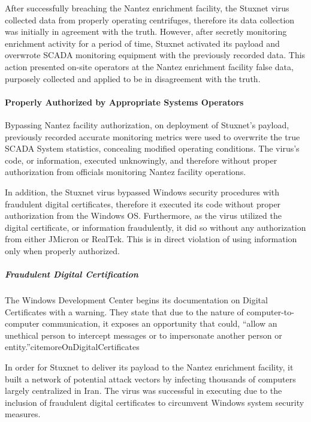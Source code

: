\documentclass[12pt]{article}
\begin{document}
\begin{multicols}{2}
After successfully breaching the Nantez enrichment facility, the Stuxnet virus collected data from properly operating centrifuges, therefore its data collection was initially in agreement with the truth. However, after secretly monitoring enrichment activity for a period of time, Stuxnet activated its payload and overwrote SCADA monitoring equipment with the previously recorded data.\cite{toKillACentrifuge} This action presented on-site operators at the Nantez enrichment facility false data, purposely collected and applied to be in disagreement with the truth.

\paragraph{Properly Authorized by Appropriate Systems Operators}

Bypassing Nantez facility authorization, on deployment of Stuxnet's payload, previously recorded accurate monitoring metrics were used to overwrite the true SCADA System statistics, concealing modified operating conditions.\cite{theRealStoryOfStuxnet} The virus's code, or information, executed unknowingly, and therefore without proper authorization from officials monitoring Nantez facility operations.

In addition, the Stuxnet virus bypassed Windows security procedures with fraudulent digital certificates, therefore it executed its code without proper authorization from the Windows OS. Furthermore, as the virus utilized the digital certificate, or information fraudulently, it did so without any authorization from either JMicron or RealTek.\cite{signedUsingCertificates} This is in direct violation of using information only when properly authorized.

\subparagraph{Fraudulent Digital Certification}

The Windows Development Center begins its documentation on Digital Certificates with a warning. They state that due to the nature of computer-to-computer communication, it exposes an opportunity that could, ``allow an unethical person to intercept messages or to impersonate another person or entity.''cite{moreOnDigitalCertificates}

In order for Stuxnet to deliver its payload to the Nantez enrichment facility, it built a network of potential attack vectors by infecting thousands of computers largely centralized in Iran.\cite{lessonsFromStuxnet} The virus was successful in executing due to the inclusion of fraudulent digital certificates to circumvent Windows system security measures.


\end{multicols}
\end{document}
